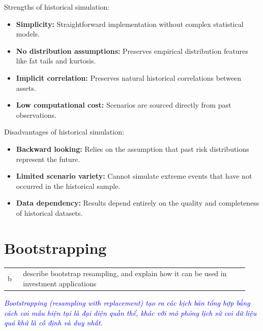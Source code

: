 Strengths of historical simulation:
\begin{itemize}
	\item \textbf{Simplicity:} Straightforward implementation without complex statistical models.
	\item \textbf{No distribution assumptions:} Preserves empirical distribution features like fat tails and kurtosis.
	\item \textbf{Implicit correlation:} Preserves natural historical correlations between assets.
	\item \textbf{Low computational cost:} Scenarios are sourced directly from past observations.
\end{itemize}

Disadvantages of historical simulation:
\begin{itemize}
	\item \textbf{Backward looking:} Relies on the assumption that past risk distributions represent the future.
	\item \textbf{Limited scenario variety:} Cannot simulate extreme events that have not occurred in the historical sample.
	\item \textbf{Data dependency:} Results depend entirely on the quality and completeness of historical datasets.
\end{itemize}


\section{Bootstrapping}
\label{sec:Bootstrapping}

\begin{center}
\begin{tabular}{p{0.06\linewidth} | p{0.88\linewidth}}
	b & describe bootstrap resampling, and explain how it can be used in investment applications \\
\end{tabular}
\end{center}

\textcolor{blue}{\textit{Bootstrapping (resampling with replacement) tạo ra các kịch bản tổng hợp bằng cách coi mẫu hiện tại là đại diện quần thể, khác với mô phỏng lịch sử coi dữ liệu quá khứ là cố định và duy nhất.}}

